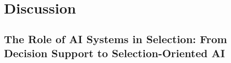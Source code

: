 

\chapter{\label{ch:discussion}Discussion}

\minitoc

\section{The Role of AI Systems in Selection: From Decision Support to Selection-Oriented AI}





